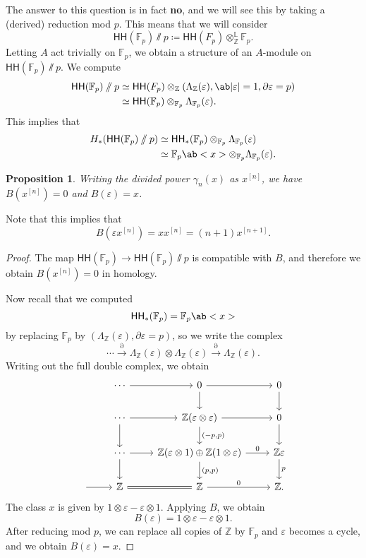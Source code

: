 \documentclass[10pt, oneside]{memoir}
\newtheorem{prop}[thm]{Proposition}
\theoremstyle{definition}
\theoremstyle{remark}
\theoremstyle{plain}
\theoremstyle{definition}
\theoremstyle{remark}
\newcommand{\Z}{\mathbb{Z}}
\newcommand{\F}{\mathbb{F}}
\renewcommand{\L}{\mathbb{L}}
\newcommand{\ep}{\varepsilon}
\newcommand{\ms}[1]{\mathsf{#1}}
\newcommand{\1}{\mathbf{1}}
\newcommand{\2}{\mathbf{2}}
\newcommand{\3}{\mathbf{3}}
\newcommand{\HH}{\ms{HH}}
\begin{document}
The answer to this question is in fact \textbf{no}, and we will see this by taking a (derived) reduction mod $p$. This means that we will consider
\[ \HH(\F_p) \sslash p \coloneqq \HH(F_p) \otimes_{\Z}^{\L} \F_p. \]
Letting $A$ act trivially on $\F_p$, we obtain a structure of an $A$-module on $\HH(\F_p) \sslash p$. We compute
\begin{align*}
    \HH(\F_p) \sslash p &\simeq \HH(F_p) \otimes_{\Z} (\Lambda_{\Z}(\ep), \ab|\ep| = 1, \partial \ep = p) \\
    &\simeq \HH(\F_p) \otimes_{\F_p} \Lambda_{\F_p}(\ep).
\end{align*}
This implies that
\begin{align*}
    H_* (\HH(\F_p) \sslash p) &\simeq \HH_*(\F_p) \otimes_{\F_p} \Lambda_{\F_p}(\ep) \\
    &\simeq \F_p \ab<x> \otimes_{\F_p} \Lambda_{\F_p}(\ep).
\end{align*}
\begin{prop}
    Writing the divided power $\gamma_n(x)$ as $x^{[n]}$, we have $B(x^{[n]}) = 0$ and $B(\ep) = x$.
\end{prop}
Note that this implies that 
\[ B(\ep x^{[n]}) = x x^{[n]} = (n+1)x^{[n+1]}. \]

\begin{proof}
    The map $\HH(\F_p) \to \HH(\F_p) \sslash p$ is compatible with $B$, and therefore we obtain $B(x^{[n]}) = 0$ in homology.

    Now recall that we computed
    \[ \HH_*(\F_p) = \F_p\ab<x> \]
    by replacing $\F_p$ by $(\Lambda_{\Z}(\ep), \partial \ep = p)$, so we write the complex
    \[ \cdots \xrightarrow{\partial} \Lambda_{\Z}(\ep) \otimes \Lambda_{\Z} (\ep) \xrightarrow{\partial} \Lambda_{\Z}(\ep). \]
    Writing out the full double complex, we obtain
    \begin{equation*}
    \begin{tikzcd}
        &\cdots \ar{r} & 0 \ar{r} \ar{d} & 0 \ar{d} \\
        &\cdots \ar{r} \ar{d} & \Z(\ep \otimes \ep) \ar{r} \ar{d}{(-p,p)} & 0 \ar{d} \\
        &\cdots \ar{r} \ar{d} & \Z(\ep \otimes 1) \oplus \Z(1 \otimes \ep) \ar{r}{0} \ar{d}{(p,p)}& \Z \ep \ar{d}{p} \\
        {}\ar{r}&\Z \ar[equals]{r} & \Z \ar{r}{0} & \Z.
    \end{tikzcd}
    \end{equation*}
    The class $x$ is given by $1 \otimes \ep - \ep \otimes 1$. Applying $B$, we obtain
    \[ B(\ep) = 1 \otimes \ep - \ep \otimes 1. \]
    After reducing mod $p$, we can replace all copies of $\Z$ by $\F_p$ and $\ep$ becomes a cycle, and we obtain $B(\ep) = x$.
\end{proof}
\end{document}
